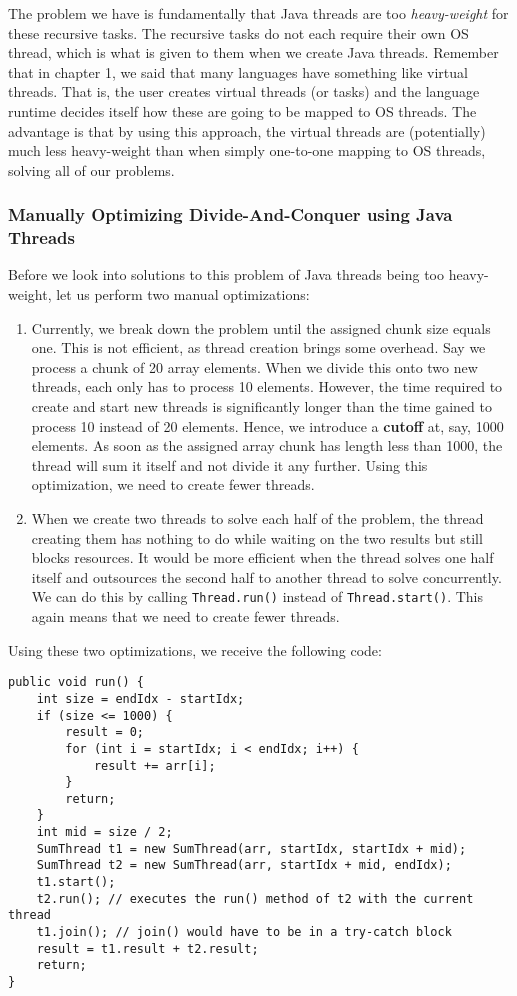 \documentclass[main.tex]{subfiles}
\begin{document}
\noindent The problem we have is fundamentally that Java threads are too \textit{heavy-weight} for these recursive tasks. The recursive tasks do not each require their own OS thread, which is what is given to them when we create Java threads. Remember that in chapter 1, we said that many languages have something like virtual threads. That is, the user creates virtual threads (or tasks) and the language runtime decides itself how these are going to be mapped to OS threads. The advantage is that by using this approach, the virtual threads are (potentially) much less heavy-weight than when simply one-to-one mapping to OS threads, solving all of our problems.

\subsubsection{Manually Optimizing Divide-And-Conquer using Java Threads}
Before we look into solutions to this problem of Java threads being too heavy-weight, let us perform two manual optimizations:

\begin{enumerate}
  \item Currently, we break down the problem until the assigned chunk size equals one. This is not efficient, as thread creation brings some overhead. Say we process a chunk of 20 array elements. When we divide this onto two new threads, each only has to process 10 elements. However, the time required to create and start new threads is significantly longer than the time gained to process 10 instead of 20 elements. Hence, we introduce a \textbf{cutoff} at, say, 1000 elements. As soon as the assigned array chunk has length less than 1000, the thread will sum it itself and not divide it any further. Using this optimization, we need to create fewer threads.
  \item When we create two threads to solve each half of the problem, the thread creating them has nothing to do while waiting on the two results but still blocks resources. It would be more efficient when the thread solves one half itself and outsources the second half to another thread to solve concurrently. We can do this by calling \texttt{Thread.run()} instead of \texttt{Thread.start()}. This again means that we need to create fewer threads.
\end{enumerate}

\noindent Using these two optimizations, we receive the following code:

\begin{verbatim}
public void run() {
    int size = endIdx - startIdx;
    if (size <= 1000) {
        result = 0;
        for (int i = startIdx; i < endIdx; i++) {
            result += arr[i];
        }
        return;
    }
    int mid = size / 2;
    SumThread t1 = new SumThread(arr, startIdx, startIdx + mid);
    SumThread t2 = new SumThread(arr, startIdx + mid, endIdx);
    t1.start();
    t2.run(); // executes the run() method of t2 with the current thread
    t1.join(); // join() would have to be in a try-catch block
    result = t1.result + t2.result;
    return;
}
\end{verbatim}
\end{document}
